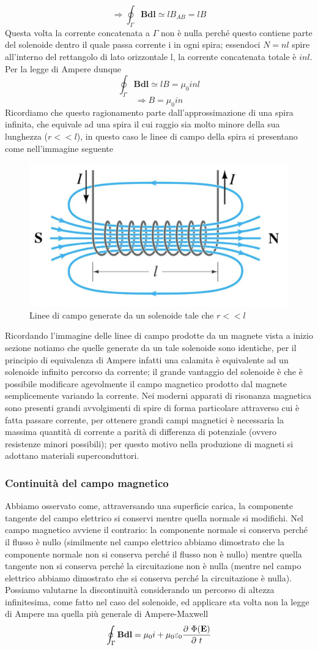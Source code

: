 \documentclass[10pt,a4paper]{article}
\def\d{\ensuremath\partial}
\def\d{\ensuremath\partial\ }
\begin{document}
\FloatBarrier
\[\Rightarrow \oint_{\Gamma}\mathbf{B}\mathbf{dl}\simeq lB_{AB}= lB\]
Questa volta la corrente concatenata a $\Gamma$ non è nulla perché questo contiene parte del solenoide dentro il quale passa corrente i in ogni spira; essendoci \(N = n l\) spire all'interno del rettangolo di lato orizzontale l, la corrente concatenata totale è \(inl\). Per la legge di Ampere dunque
\[\oint_{\Gamma}\mathbf{B}\mathbf{dl}\simeq lB= \mu_0 inl\]
\[\Rightarrow B = \mu_0 i n\]
Ricordiamo che questo ragionamento parte dall'approssimazione di una spira infinita, che equivale ad una spira il cui raggio sia molto minore della sua lunghezza (\(r<<l\)), in questo caso le linee di campo della spira si presentano come nell'immagine seguente
\begin{figure}[h!]
	\centering
	\includegraphics[width=0.6\linewidth]{images/linee_campo_solenoide}
	\caption{Linee di campo generate da un solenoide tale che \(r<<l\)}
	\label{fig:lineecamposolenoide}
\end{figure}
\FloatBarrier
Ricordando l'immagine delle linee di campo prodotte da un magnete vista a inizio sezione notiamo che quelle generate da un tale solenoide sono identiche, per il principio di equivalenza di Ampere infatti una calamita è equivalente ad un solenoide infinito percorso da corrente; il grande vantaggio del solenoide è che è possibile modificare agevolmente il campo magnetico prodotto dal magnete semplicemente variando la corrente. Nei moderni apparati di risonanza magnetica sono presenti grandi avvolgimenti di spire di forma particolare attraverso cui è fatta passare corrente, per ottenere grandi campi magnetici è necessaria la massima quantità di corrente a parità di differenza di potenziale (ovvero resistenze minori possibili); per questo motivo nella produzione di magneti si adottano materiali superconduttori. 
\subsubsection{Continuità del campo magnetico}
Abbiamo osservato come, attraversando una superficie carica, la componente tangente del campo elettrico si conservi mentre quella normale si modifichi. Nel campo magnetico avviene il contrario: la componente normale si conserva perché il flusso è nullo (similmente nel campo elettrico abbiamo dimostrato che la componente normale non si conserva perché il flusso non è nullo) mentre quella tangente non si conserva perché la circuitazione non è nulla (mentre nel campo elettrico abbiamo dimostrato che si conserva perché la circuitazione è nulla). Possiamo valutarne la discontinuità considerando un percorso di altezza infinitesima, come fatto nel caso del solenoide, ed applicare sta volta non la legge di Ampere ma quella più generale di Ampere-Maxwell
\[\oint_{\Gamma}\mathbf{B}\mathbf{dl}=\mu_0 i + \mu_0\varepsilon_0 \frac{\d \Phi(\mathbf{E})}{\d t}\]
\end{document}
